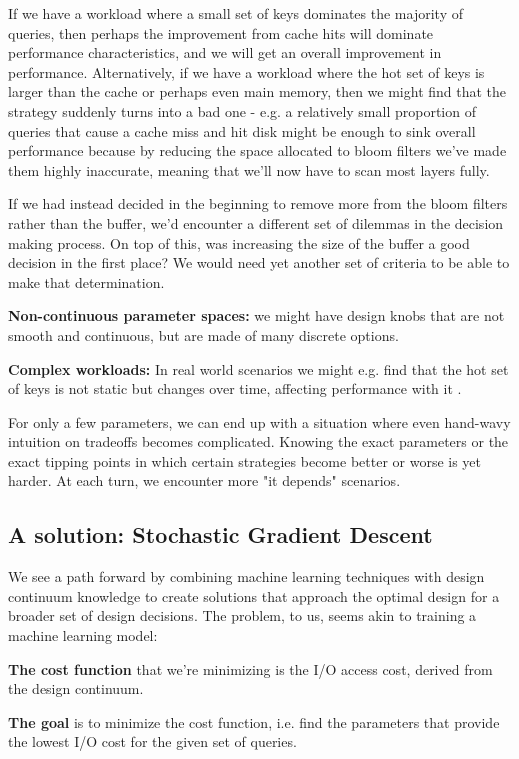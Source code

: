 \documentclass{cidr-2019}
\begin{document}
If we have a workload where a small set of keys dominates the majority of
queries, then perhaps the improvement from cache hits will dominate performance
characteristics, and we will get an overall improvement in performance.
Alternatively, if we have a workload where the hot set of keys is larger than
the cache or perhaps even main memory, then we might find that the strategy
suddenly turns into a bad one - e.g. a relatively small proportion of queries
that cause a cache miss and hit disk might be enough to sink overall
performance because by reducing the space allocated to bloom filters we've made
them highly inaccurate, meaning that we'll now have to scan most layers fully. 

If we had instead decided in the beginning to remove more from the bloom
filters rather than the buffer, we'd encounter a different set of dilemmas in
the decision making process. On top of this, was increasing the size of the
buffer a good decision in the first place? We would need yet another set of
criteria to be able to make that determination.

\textbf{Non-continuous parameter spaces:} we might have design knobs that are
not smooth and continuous, but are made of many discrete options.

\textbf{Complex workloads:} In real world scenarios we might e.g. find that the
hot set of keys is not static but changes over time, affecting performance with
it \cite{characterizing-memcached}.

For only a few parameters, we can end up with a situation where even hand-wavy
intuition on tradeoffs becomes complicated. Knowing the exact parameters or the
exact tipping points in which certain strategies become better or worse is yet
harder. At each turn, we encounter more "it depends" scenarios.

\subsection{A solution: Stochastic Gradient Descent}

We see a path forward by combining machine learning techniques with design
continuum knowledge to create solutions that approach the optimal design for a
broader set of design decisions. The problem, to us, seems akin to training a
machine learning model:

\textbf{The cost function} that we're minimizing is the I/O access cost,
derived from the design continuum.

\textbf{The goal} is to minimize the cost function, i.e. find the parameters
that provide the lowest I/O cost for the given set of queries.
\end{document}
